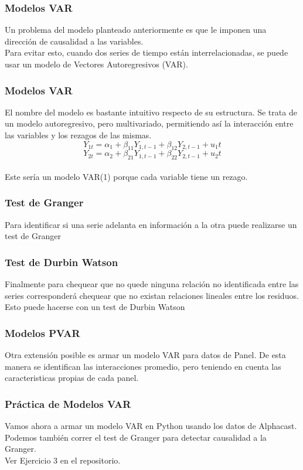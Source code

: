 \documentclass{beamer}
\begin{document}
\begin{frame}
\frametitle{Modelos VAR}
Un problema del modelo planteado anteriormente es que le imponen una dirección de causalidad a las variables.\\ 
\vspace{5mm} %
Para evitar esto, cuando dos series de tiempo están interrelacionadas, se puede usar un modelo de Vectores Autoregresivos (VAR).\\
\end{frame}

\begin{frame}
\frametitle{Modelos VAR}
El nombre del modelo es bastante intuitivo respecto de su estructura. Se trata de un modelo autoregresivo, pero multivariado, permitiendo así la interacción entre las variables y los rezagos de las mismas.\\ 
\vspace{5mm} %
\[
Y_{1t}=\alpha_1+\beta_{11}Y_{1,t-1}+\beta_{12}Y_{2,t-1}+u_1t
\]
\[
Y_{2t}=\alpha_2+\beta_{21}Y_{1,t-1}+\beta_{22}Y_{2,t-1}+u_2t
\]
\\
\vspace{5mm} %
Este sería un modelo VAR(1) porque cada variable tiene un rezago. 

\end{frame}

\begin{frame}
\frametitle{Test de Granger}
Para identificar si una serie adelanta en información a la otra puede realizarse un test de Granger
\end{frame}


\begin{frame}
\frametitle{Test de Durbin Watson}
Finalmente para chequear que no quede ninguna relación no identificada entre las series corresponderá chequear que no existan relaciones lineales entre los residuos. Esto puede hacerse con un test de Durbin Watson 
\end{frame}

\begin{frame}
\frametitle{Modelos PVAR}
Otra extensión posible es armar un modelo VAR para datos de Panel. De esta manera se identifican las interacciones promedio, pero teniendo en cuenta las caracteristicas propias de cada panel. \\
\end{frame}


\begin{frame}
\frametitle{Práctica de Modelos VAR}
Vamos ahora a armar un modelo VAR en Python usando los datos de Alphacast. Podemos también correr el test de Granger para detectar causalidad a la Granger. \\
\vspace{5mm} %
Ver Ejercicio 3 en el repositorio.\\
\end{frame}
\end{document}

